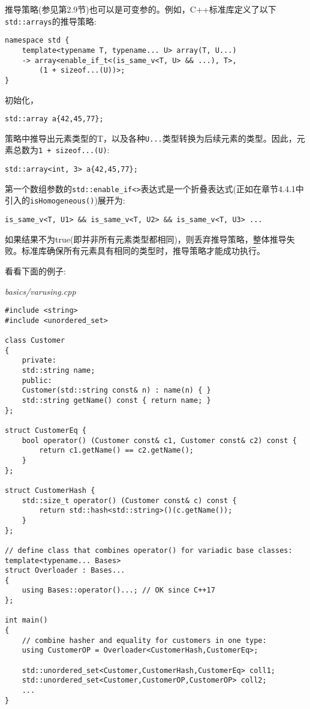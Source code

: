 推导策略(参见第2.9节)也可以是可变参的。例如，C++标准库定义了以下\texttt{std::arrays}的推导策略:

\begin{lstlisting}[style=styleCXX]
namespace std {
	template<typename T, typename... U> array(T, U...)
	-> array<enable_if_t<(is_same_v<T, U> && ...), T>,
		(1 + sizeof...(U))>;
}
\end{lstlisting}

初始化，

\begin{lstlisting}[style=styleCXX]
std::array a{42,45,77};
\end{lstlisting}

策略中推导出元素类型的T，以及各种\texttt{U...}类型转换为后续元素的类型。因此，元素总数为\texttt{1 + sizeof...(U)}:

\begin{lstlisting}[style=styleCXX]
std::array<int, 3> a{42,45,77};
\end{lstlisting}

第一个数组参数的\texttt{std::enable\_if<>}表达式是一个折叠表达式(正如在章节4.4.1中引入的\texttt{isHomogeneous()})展开为:

\begin{lstlisting}[style=styleCXX]
is_same_v<T, U1> && is_same_v<T, U2> && is_same_v<T, U3> ...
\end{lstlisting}

如果结果不为true(即并非所有元素类型都相同)，则丢弃推导策略，整体推导失败。标准库确保所有元素具有相同的类型时，推导策略才能成功执行。


看看下面的例子:

\noindent
\textit{basics/varusing.cpp}
\begin{lstlisting}[style=styleCXX]
#include <string>
#include <unordered_set>

class Customer
{
	private:
	std::string name;
	public:
	Customer(std::string const& n) : name(n) { }
	std::string getName() const { return name; }
};

struct CustomerEq {
	bool operator() (Customer const& c1, Customer const& c2) const {
		return c1.getName() == c2.getName();
	}
};

struct CustomerHash {
	std::size_t operator() (Customer const& c) const {
		return std::hash<std::string>()(c.getName());
	}
};

// define class that combines operator() for variadic base classes:
template<typename... Bases>
struct Overloader : Bases...
{
	using Bases::operator()...; // OK since C++17
};

int main()
{
	// combine hasher and equality for customers in one type:
	using CustomerOP = Overloader<CustomerHash,CustomerEq>;
	
	std::unordered_set<Customer,CustomerHash,CustomerEq> coll1;
	std::unordered_set<Customer,CustomerOP,CustomerOP> coll2;
	...
}
\end{lstlisting}

